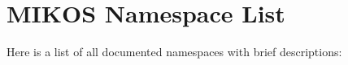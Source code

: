 \section{MIKOS Namespace List}
Here is a list of all documented namespaces with brief descriptions:\begin{CompactList}
\item{}
\end{CompactList}
